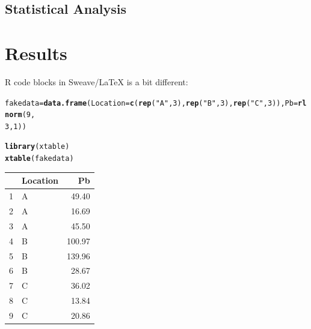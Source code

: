 \documentclass{article}\usepackage[]{graphicx}\usepackage[]{color}
\makeatletter
\newcommand{\hlnum}[1]{\textcolor[rgb]{0.686,0.059,0.569}{#1}}%
\newcommand{\hlstr}[1]{\textcolor[rgb]{0.192,0.494,0.8}{#1}}%
\newcommand{\hlstd}[1]{\textcolor[rgb]{0.345,0.345,0.345}{#1}}%
\newcommand{\hlkwb}[1]{\textcolor[rgb]{0.69,0.353,0.396}{#1}}%
\newcommand{\hlkwc}[1]{\textcolor[rgb]{0.333,0.667,0.333}{#1}}%
\newcommand{\hlkwd}[1]{\textcolor[rgb]{0.737,0.353,0.396}{\textbf{#1}}}%
\newenvironment{kframe}{%
 \def\at@end@of@kframe{}%
 \ifinner\ifhmode%
  \def\at@end@of@kframe{\end{minipage}}%
  \begin{minipage}{\columnwidth}%
 \fi\fi%
 \def\FrameCommand##1{\hskip\@totalleftmargin \hskip-\fboxsep
 \colorbox{shadecolor}{##1}\hskip-\fboxsep
     \hskip-\linewidth \hskip-\@totalleftmargin \hskip\columnwidth}%
 \MakeFramed {\advance\hsize-\width
   \@totalleftmargin\z@ \linewidth\hsize
   \@setminipage}}%
 {\par\unskip\endMakeFramed%
 \at@end@of@kframe}
\newenvironment{knitrout}{}{} %
\makeatother
\begin{document}
\subsection{Statistical Analysis}





\section{Results}

R code blocks in Sweave/LaTeX is a bit different:

\begin{knitrout}
\color{fgcolor}\begin{kframe}
\begin{alltt}
\hlstd{fakedata} \hlkwb{=} \hlkwd{data.frame}\hlstd{(}\hlkwc{Location} \hlstd{=} \hlkwd{c}\hlstd{(}\hlkwd{rep}\hlstd{(}\hlstr{"A"}\hlstd{,} \hlnum{3}\hlstd{),} \hlkwd{rep}\hlstd{(}\hlstr{"B"}\hlstd{,} \hlnum{3}\hlstd{),} \hlkwd{rep}\hlstd{(}\hlstr{"C"}\hlstd{,} \hlnum{3}\hlstd{)),} \hlkwc{Pb} \hlstd{=} \hlkwd{rlnorm}\hlstd{(}\hlnum{9}\hlstd{,}
    \hlnum{3}\hlstd{,} \hlnum{1}\hlstd{))}
\end{alltt}
\end{kframe}
\end{knitrout}

\begin{kframe}
\begin{alltt}
\hlkwd{library}\hlstd{(xtable)}
\hlkwd{xtable}\hlstd{(fakedata)}
\end{alltt}
\end{kframe}%
\begin{table}[ht]
\centering
\begin{tabular}{rlr}
  \hline
 & Location & Pb \\ 
  \hline
1 & A & 49.40 \\ 
  2 & A & 16.69 \\ 
  3 & A & 45.50 \\ 
  4 & B & 100.97 \\ 
  5 & B & 139.96 \\ 
  6 & B & 28.67 \\ 
  7 & C & 36.02 \\ 
  8 & C & 13.84 \\ 
  9 & C & 20.86 \\ 
   \hline
\end{tabular}
\end{table}
\end{document}
